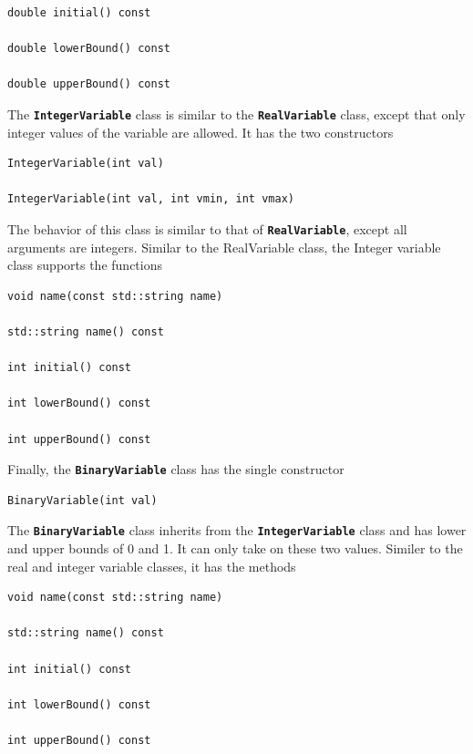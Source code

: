 \documentclass[12pt]{report} %
\begin{document}
{
\color{red}
\begin{Verbatim}[fontseries=b]
double initial() const

double lowerBound() const

double upperBound() const
\end{Verbatim}
}

The \texttt{\textbf{IntegerVariable}} class is similar to the \texttt{\textbf{RealVariable}} class, except that only integer values of the variable are allowed. It has the two constructors

{
\color{red}
\begin{Verbatim}[fontseries=b]
IntegerVariable(int val)

IntegerVariable(int val, int vmin, int vmax)
\end{Verbatim}
}

The behavior of this class is similar to that of \texttt{\textbf{RealVariable}}, except all arguments are integers. Similar to the RealVariable class, the Integer variable class supports the functions

{
\color{red}
\begin{Verbatim}[fontseries=b]
void name(const std::string name)

std::string name() const

int initial() const

int lowerBound() const

int upperBound() const
\end{Verbatim}
}

Finally, the \texttt{\textbf{BinaryVariable}} class has the single constructor

{
\color{red}
\begin{Verbatim}[fontseries=b]
BinaryVariable(int val)
\end{Verbatim}
}

The \texttt{\textbf{BinaryVariable}} class inherits from the \texttt{\textbf{IntegerVariable}} class and has lower and upper bounds of 0 and 1. It can only take on these two values. Similer to the real and integer variable classes, it has the methods

{
\color{red}
\begin{Verbatim}[fontseries=b]
void name(const std::string name)

std::string name() const

int initial() const

int lowerBound() const

int upperBound() const
\end{Verbatim}
}
\end{document}
